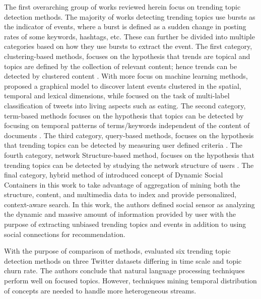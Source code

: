 The first overarching group of works reviewed herein focus on trending topic detection methods. The majority of works detecting trending topics use bursts as the indicator of events, where a burst is defined as a sudden change in posting rates of some keywords, hashtags, etc. These can further be divided into multiple categories based on how they use bursts to extract the event. The first category, clustering-based methods, focuses on the hypothesis that trends are topical and topics are defined by the collection of relevant content; hence trends can be detected by clustered content \cite{petrovic,ishikawa,murata,becker,tweetmotif,wangLee}. With more focus on machine learning methods, \cite{wei} proposed a graphical model to discover latent events clustered in the spatial, temporal and lexical dimensions, while \cite{yamamoto} focused on the task of multi-label classification of tweets into living aspects such as eating.%
The second category, term-based methods focuses on the hypothesis that topics can be detected by focusing on temporal patterns of terms/keywords independent of the content of documents \cite{mathioudakis,cuiZhang,zhaoSports,nichols}. The third category, query-based methods, focuses on the hypothesis that trending topics can be detected by measuring user defined criteria \cite{albakour,sakakiDrive}. The fourth category, network Structure-based method, focuses on the hypothesis that trending topics can be detected by studying the network structure of users \cite{budak}. The final category, hybrid method of \cite{diplaris} introduced concept of Dynamic Social Containers in this work to take advantage of aggregation of mining both the structure, content, and multimedia data to index and provide personalized, context-aware search. In this work, the authors defined social sensor as analyzing the dynamic and massive amount of information provided by user with the purpose of extracting unbiased trending topics and events in addition to using social connections for recommendation.

With the purpose of comparison of methods, \cite{aiello} evaluated six trending topic detection methods on three Twitter datasets differing in time scale and topic churn rate. The authors conclude that natural language processing techniques perform well on focused topics. However, techniques mining temporal distribution of concepts are needed to handle more heterogeneous streams.

